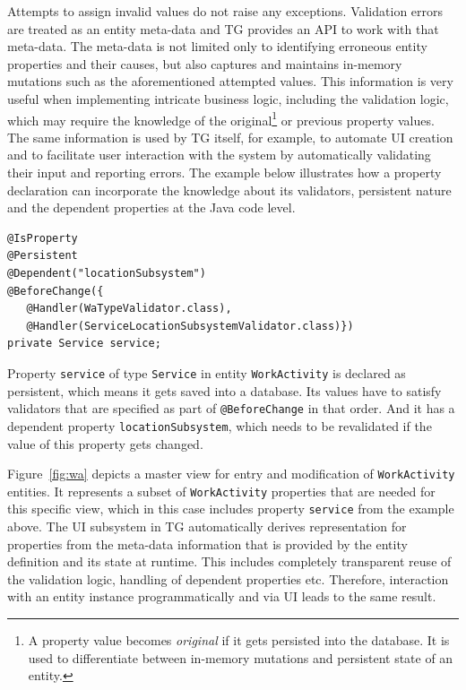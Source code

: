 \documentclass[a4paper,12pt,oneside,openright,final]{memoir} %
\begin{document}
	Attempts to assign invalid values do not raise any exceptions.
	Validation errors are treated as an entity meta-data and TG provides an API to work with that meta-data.
	The meta-data is not limited only to identifying erroneous entity properties and their causes, but also captures and maintains in-memory mutations such as the aforementioned attempted values.
	This information is very useful when implementing intricate business logic, including the validation logic, which may require the knowledge of the original\footnote{A property value becomes \emph{original} if it gets persisted into the database. It is used to differentiate between in-memory mutations and persistent state of an entity.} or previous property values.
	The same information is used by TG itself, for example, to automate UI creation and to facilitate user interaction with the system by automatically validating their input and reporting errors.	
	The example below illustrates how a property declaration can incorporate the knowledge about its validators, persistent nature and the dependent properties at the Java code level.
	
	\begin{tcolorbox}[sidebyside, righthand width=0.3\textwidth, title=Example: property declaration with multiple validators]
    \begin{lstlisting}[numbersep=2pt]
@IsProperty
@Persistent
@Dependent("locationSubsystem")
@BeforeChange({
   @Handler(WaTypeValidator.class),
   @Handler(ServiceLocationSubsystemValidator.class)})
private Service service;
    \end{lstlisting}
	
	\tcblower
		\tiny
		Property \texttt{service} of type \texttt{Service} in entity \texttt{WorkActivity} is declared as persistent, which means it gets saved into a database.
		Its values have to satisfy validators that are specified as part of \texttt{@BeforeChange} in that order.
		And it has a dependent property \texttt{locationSubsystem}, which needs to be revalidated if the value of this property gets changed.	
 	\end{tcolorbox}

	Figure~\ref{fig:wa} depicts a master view for entry and modification of \texttt{WorkActivity} entities.
	It represents a subset of \texttt{WorkActivity} properties that are needed for this specific view, which in this case includes property \texttt{service} from the example above.
	The UI subsystem in TG automatically derives representation for properties from the meta-data information that is provided by the entity definition and its state at runtime.
	This includes completely transparent reuse of the validation logic, handling of dependent properties etc.
	Therefore, interaction with an entity instance programmatically and via UI leads to the same result.
	
\end{document}
